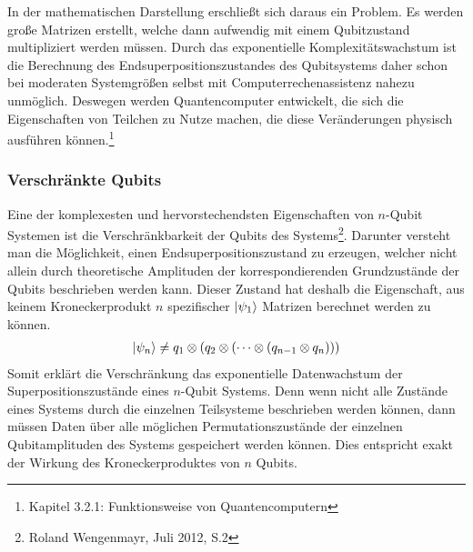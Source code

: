 \documentclass[12pt]{report}
\begin{document}
In der mathematischen Darstellung erschließt sich daraus ein Problem. Es werden große Matrizen erstellt, welche dann aufwendig mit einem Qubitzustand multipliziert werden müssen. Durch das exponentielle Komplexitätswachstum ist die Berechnung des Endsuperpositionszustandes des Qubitsystems daher schon bei moderaten Systemgrößen selbst mit Computerrechenassistenz nahezu unmöglich. Deswegen werden Quantencomputer entwickelt, die sich die Eigenschaften von Teilchen zu Nutze machen, die diese Veränderungen physisch ausführen können.\footnote{Kapitel 3.2.1: Funktionsweise von Quantencomputern}

\subsubsection{Verschränkte Qubits}							%
Eine der komplexesten und hervorstechendsten Eigenschaften von $n$-Qubit Systemen ist die Verschränkbarkeit der Qubits des Systems\footnote{Roland Wengenmayr, Juli 2012, S.2}.
Darunter versteht man die Möglichkeit, einen Endsuperpositionszustand zu erzeugen, welcher nicht allein durch theoretische Amplituden der korrespondierenden Grundzustände der Qubits beschrieben werden kann. Dieser Zustand hat deshalb die Eigenschaft, 
aus keinem Kroneckerprodukt $n$ spezifischer $\ket{\psi_1}$ Matrizen berechnet werden zu können.
\begin{align*}
\ket{\psi_n} \neq q_1 \otimes (q_2 \otimes(\cdots \otimes (q_{n-1} \otimes q_n))) \\
\end{align*}
Somit erklärt die Verschränkung das exponentielle Datenwachstum der Superpositionszustände eines $n$-Qubit Systems. Denn wenn nicht alle Zustände eines Systems durch die einzelnen Teilsysteme beschrieben werden können, dann müssen Daten über alle möglichen Permutationszustände der einzelnen Qubitamplituden des Systems gespeichert werden können. Dies entspricht exakt der Wirkung des Kroneckerproduktes von $n$ Qubits.\\
\end{document}
